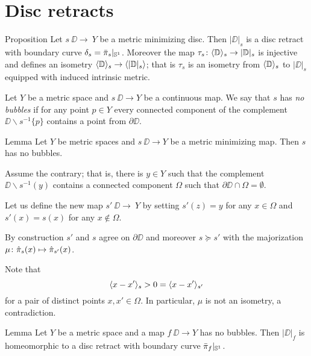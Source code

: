 \section{Disc retracts}\label{Metric minimizing discs}

\begin{thm}{Proposition}\label{prop:|D|}
Let $s\:\DD\to\ Y$ be a metric minimizing disc.
Then $|\DD|_s$ is a disc retract with boundary curve $\delta_s=\bar\pi_s|_{\mathbb{S}^1}$.
Moreover the map $\tau_s\colon\langle\mathbb{D}\rangle_s\to |\mathbb{D}|_s$ is injective and defines an isometry
$\langle\mathbb{D}\rangle_s\to \langle|\mathbb{D}|_s\rangle$;
that is $\tau_s$ is an isometry from $\langle\mathbb{D}\rangle_s$ to $|\DD|_s$ equipped with induced intrinsic metric.
\end{thm}

Let $Y$ be a metric space and
$s\:\DD\to Y$ be a continuous map.
We say that $s$ has \label{page:no-bubble}\emph{no bubbles}
if for any point $p\in Y$ every connected component of the complement $\DD\backslash s^{-1}\{p\}$ contains a point from $\partial \DD$.

\begin{thm}{Lemma}\label{prop:point-complement}
Let $Y$ be metric spaces and $s\:\DD\to Y$ be a metric minimizing map.
Then $s$ has no bubbles.
\end{thm}

Assume the contrary;
that is, there is $y\in Y$ such that the complement $\DD\backslash s^{-1}(y)$ contains a connected component $\Omega$ such that $\partial \DD\cap \Omega=\emptyset$.

Let us define the new map $s'\:\DD\to\ Y$ by setting $s'(z)=y$ for any $x\in \Omega$ and $s'(x)=s(x)$ for any $x\notin \Omega$.

By construction $s'$ and $s$ agree on $\partial\DD$ and moreover $s\succcurlyeq s'$
with the majorization $\mu\:\hat\pi_s(x)\zz\mapsto \hat\pi_{s'}(x)$.

Note that
\[\langle x-x'\rangle_{s}>0=\langle x-x'\rangle_{s'}\]
for a pair of distinct points $x,x'\in \Omega$.
In particular, $\mu$ is not an isometry, a contradiction.
\qeds



\begin{thm}{Lemma}\label{prop:disc-moore}
Let $Y$ be a metric space and a map $f\:\DD\to Y$ has no bubbles.
Then $|\DD|_f$ is homeomorphic to a disc retract with boundary curve $\bar\pi_f|_{\mathbb{S}^1}$.
\end{thm}

